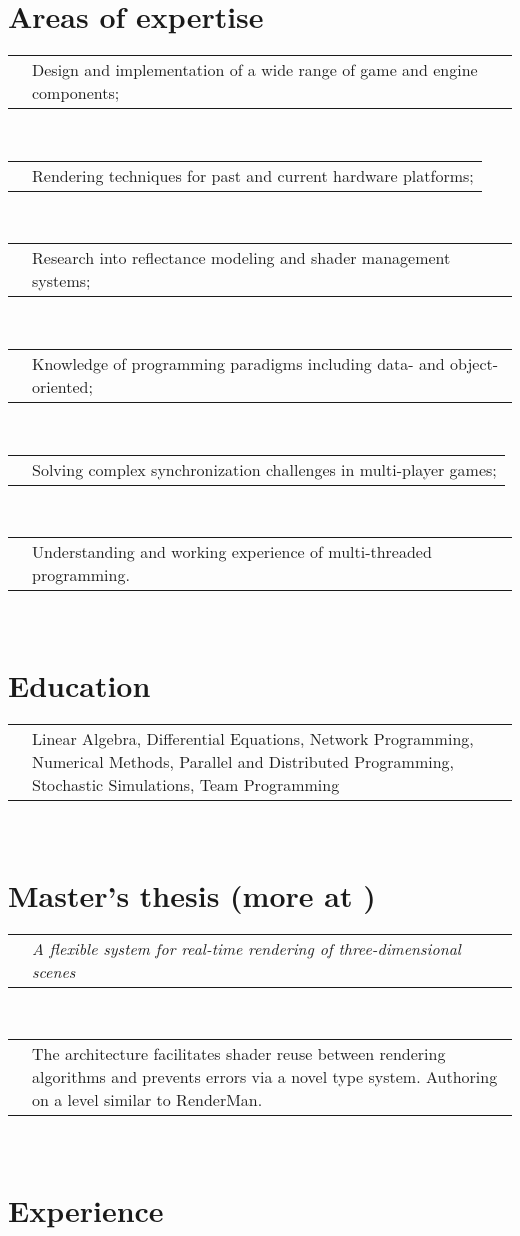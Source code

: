 \documentclass[11pt,a4paper]{moderncv}
\makeatletter
\newcommand\novspace{\@minipagetrue}
\renewcommand*{\cvline}[3][.25em]{%
  \begin{tabular}{@{}p{\hintscolumnwidth}@{\hspace{\separatorcolumnwidth}}p{\maincolumnwidth}@{}}%
 	  \raggedleft\hintfont{#2} &{\novspace #3}%
  \end{tabular}\\[#1]}
\makeatother
\begin{document}
\maketitle

\section{Areas of expertise}
\cvline{$\Longrightarrow$}{\small Design and implementation of a wide range of game and engine components;}
\cvline{$\Longrightarrow$}{\small Rendering techniques for past and current hardware platforms;}
\cvline{$\Longrightarrow$}{\small Research into reflectance modeling and shader management systems;}
\cvline{$\Longrightarrow$}{\small Knowledge of programming paradigms including data- and object- oriented;}
\cvline{$\Longrightarrow$}{\small Solving complex synchronization challenges in multi-player games;}
\cvline{$\Longrightarrow$}{\small Understanding and working experience of multi-threaded programming.}

\section{Education}
\cvline{Relevant courses}{\small Linear Algebra, Differential Equations, Network Programming, Numerical Methods, Parallel and Distributed Programming, Stochastic Simulations, Team Programming}

\section{Master's thesis \hspace{0.5em}\color{quotecolor}\small(more at )}
\cvline{Title}{\emph{A flexible system for real-time rendering of three-dimensional scenes}}
\cvline{Description}{\small The architecture facilitates shader reuse between rendering algorithms and prevents errors via a novel type system. Authoring on a level similar to RenderMan.}

\section{Experience}
\end{document}

